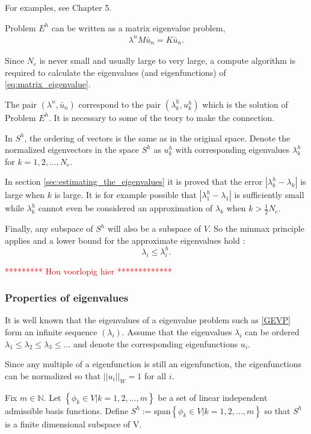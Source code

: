 \documentclass[../../main.tex]{subfiles}
\begin{document}
For examples, see Chapter 5.

Problem $E^h$ can be written as a matrix eigenvalue problem,
\begin{eqnarray}
	\lambda^nM\bar{u}_n = K\bar{u}_n. \label{eq:matrix_eigenvalue}
\end{eqnarray} 

Since $N_e$ is never small and usually large to very large, a compute algorithm is required to calculate the eigenvalues (and eigenfunctions) of \eqref{eq:matrix_eigenvalue}.

The pair $(\lambda^n, \bar{u}_n)$ correspond to the pair $(\lambda^h_k, u^h_k)$ which is the solution of Problem $E^h$. It is necessary to some of the teory to make the connection.

In $S^h$, the ordering of vectors is the same as in the original space. Denote the normalized eigenvectors in the space $S^h$ as $u^h_k$ with corresponding eigenvalues $\lambda^h_k$ for $k = 1,2,...,N_e$.

In section \ref{sec:estimating_the_eigenvalues} it is proved that the error $| \lambda_k^h - \lambda_k|$ is large when $k$ is large. It is for example possible that $|\lambda^h_1 - \lambda_1|$ is sufficiently small while $\lambda^h_k$ cannot even be considered an approximation of $\lambda_k$ when $\displaystyle k > \frac{1}{2}N_e$.

Finally, any subspace of $S^h$ will also be a subspace of $V$. So the minmax principle applies and a lower bound for the approximate eigenvalues hold \cite{SF73}:
\begin{equation}
	\lambda_i \leq \lambda_i^h.
\end{equation}

\textcolor{red}{********* Hou voorlopig hier *************}
\subsubsection*{Properties of eigenvalues}
It is well known that the eigenvalues of a eigenvalue problem such as \eqref{GEVP} form an infinite sequence $(\lambda_i)$. Assume that the eigenvalues $\lambda_i$ can be ordered $\lambda_1 \leq \lambda_2 \leq \lambda_3 \leq ...$ and denote the corresponding eigenfunctions $u_i$.

Since any multiple of a eigenfunction is still an eigenfunction, the eigenfunctions can be normalized so that $||u_i||_{W} = 1$ for all $i$.

Fix $m \in \mathbb{N}$. Let $\left\{ \phi_k \in V | k = 1,2,...,m \right\}$ be a set of linear independent admissible basis functions. Define $S^h := \text{span}\left\{\phi_k \in V | k = 1,2,...,m\right\}$ so that $S^h$ is a finite dimensional subspace of V. \label{sym:natural} \label{sym:Sh1}
\end{document}
